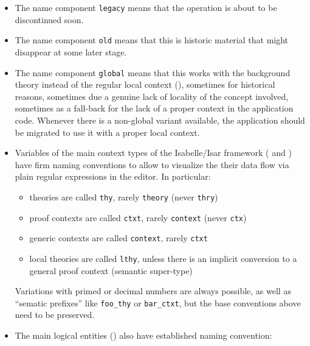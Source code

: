 \begin{isabellebody}
\begin{isamarkuptext}
\begin{itemize}
  \item The name component \verb|legacy| means that the operation
  is about to be discontinued soon.

  \item The name component \verb|old| means that this is historic
  material that might disappear at some later stage.

  \item The name component \verb|global| means that this works
  with the background theory instead of the regular local context
  (), sometimes for historical reasons, sometimes
  due a genuine lack of locality of the concept involved, sometimes as
  a fall-back for the lack of a proper context in the application
  code.  Whenever there is a non-global variant available, the
  application should be migrated to use it with a proper local
  context.

  \item Variables of the main context types of the Isabelle/Isar
  framework ( and ) have
  firm naming conventions to allow to visualize the their data flow
  via plain regular expressions in the editor.  In particular:

  \begin{itemize}

  \item theories are called \verb|thy|, rarely \verb|theory|
  (never \verb|thry|)

  \item proof contexts are called \verb|ctxt|, rarely \verb|context| (never \verb|ctx|)

  \item generic contexts are called \verb|context|, rarely
  \verb|ctxt|

  \item local theories are called \verb|lthy|, unless there is an
  implicit conversion to a general proof context (semantic super-type)

  \end{itemize}

  Variations with primed or decimal numbers are always possible, as
  well as ``sematic prefixes'' like \verb|foo_thy| or \verb|bar_ctxt|, but the base conventions above need to be preserved.

  \item The main logical entities () also have
  established naming convention:

  \begin{itemize}


\end{itemize}
\end{itemize}
\end{isamarkuptext}
\end{isabellebody}
